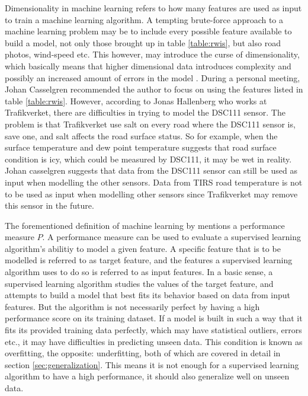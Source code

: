 	Dimensionality in machine learning refers to how many features are used as input to train a machine learning algorithm. A tempting brute-force approach to a machine learning problem may be to include every possible feature available to build a model, not only those brought up in table \ref{table:rwis}, but also road photos, wind-speed etc. This however, may introduce the curse of dimensionality, which basically means that higher dimensional data introduces complexity and possibly an increased amount of errors in the model \cite{BOOK:6}. During a personal meeting, Johan Casselgren recommended the author to focus on using the features listed in table \ref{table:rwis}. However, according to Jonas Hallenberg who works at Trafikverket, there are difficulties in trying to model the DSC111 sensor. The problem is that Trafikverket use salt on every road where the DSC111 sensor is, save one, and salt affects the road surface status. So for example, when the surface temperature and dew point temperature suggests that road surface condition is icy, which could be measured by DSC111, it may be wet in reality. Johan casselgren suggests that data from the DSC111 sensor can still be used as input when modelling the other sensors. Data from TIRS road temperature is not to be used as input when modelling other sensors since Trafikverket may remove this sensor in the future. 
	
	The forementioned definition of machine learning by \cite{BOOK:2} mentions a performance measure $P$. A performance measure can be used to evaluate a supervised learning algorithm's abilitiy to model a given feature. A specific feature that is to be modelled is referred to as target feature, and the features a supervised learning algorithm uses to do so is referred to as input features. In a basic sense, a supervised learning algorithm studies the values of the target feature, and attempts to build a model that best fits its behavior based on data from input features. But the algorithm is not necessarily perfect by having a high performance score on its training dataset. If a model is built in such a way that it fits its provided training data perfectly, which may have statistical outliers, errors etc., it may have difficulties in predicting unseen data. This condition is known as overfitting, the opposite: underfitting, both of which are covered in detail in section \ref{sec:generalization}. This means it is not enough for a supervised learning algorithm to have a high performance, it should also generalize well on unseen data. 

